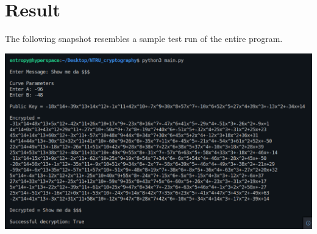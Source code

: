 \documentclass[a4paper,12pt]{article}
\begin{document}
%

\section{Result}
\begin{flushleft}
    The following snapshot resembles a sample test run of the entire program.
    \begin{center}
        \includegraphics[scale=0.35]{images/Test Run.png}
    \end{center}
\end{flushleft}
\end{document}
